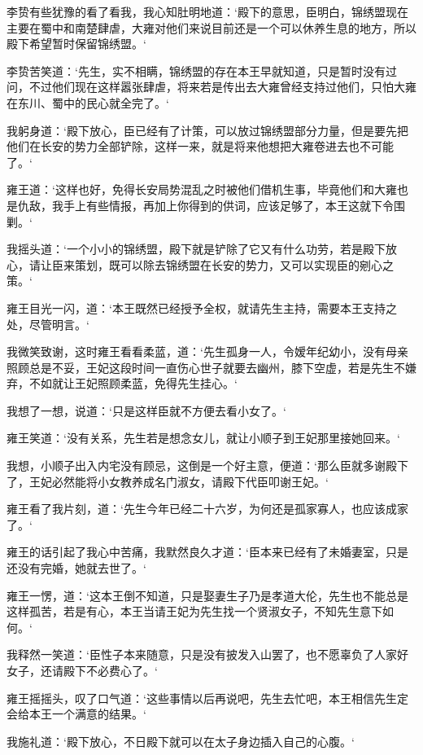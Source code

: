 李贽有些犹豫的看了看我，我心知肚明地道：‘殿下的意思，臣明白，锦绣盟现在主要在蜀中和南楚肆虐，大雍对他们来说目前还是一个可以休养生息的地方，所以殿下希望暂时保留锦绣盟。‘

李贽苦笑道：‘先生，实不相瞒，锦绣盟的存在本王早就知道，只是暂时没有过问，不过他们现在这样嚣张肆虐，将来若是传出去大雍曾经支持过他们，只怕大雍在东川、蜀中的民心就全完了。‘

我躬身道：‘殿下放心，臣已经有了计策，可以放过锦绣盟部分力量，但是要先把他们在长安的势力全部铲除，这样一来，就是将来他想把大雍卷进去也不可能了。‘

雍王道：‘这样也好，免得长安局势混乱之时被他们借机生事，毕竟他们和大雍也是仇敌，我手上有些情报，再加上你得到的供词，应该足够了，本王这就下令围剿。‘

我摇头道：‘一个小小的锦绣盟，殿下就是铲除了它又有什么功劳，若是殿下放心，请让臣来策划，既可以除去锦绣盟在长安的势力，又可以实现臣的剜心之策。‘

雍王目光一闪，道：‘本王既然已经授予全权，就请先生主持，需要本王支持之处，尽管明言。‘

我微笑致谢，这时雍王看看柔蓝，道：‘先生孤身一人，令嫒年纪幼小，没有母亲照顾总是不妥，王妃这段时间一直伤心世子就要去幽州，膝下空虚，若是先生不嫌弃，不如就让王妃照顾柔蓝，免得先生挂心。‘

我想了一想，说道：‘只是这样臣就不方便去看小女了。‘

雍王笑道：‘没有关系，先生若是想念女儿，就让小顺子到王妃那里接她回来。‘

我想，小顺子出入内宅没有顾忌，这倒是一个好主意，便道：‘那么臣就多谢殿下了，王妃必然能将小女教养成名门淑女，请殿下代臣叩谢王妃。‘

雍王看了我片刻，道：‘先生今年已经二十六岁，为何还是孤家寡人，也应该成家了。‘

雍王的话引起了我心中苦痛，我默然良久才道：‘臣本来已经有了未婚妻室，只是还没有完婚，她就去世了。‘

雍王一愣，道：‘这本王倒不知道，只是娶妻生子乃是孝道大伦，先生也不能总是这样孤苦，若是有心，本王当请王妃为先生找一个贤淑女子，不知先生意下如何。‘

我释然一笑道：‘臣性子本来随意，只是没有披发入山罢了，也不愿辜负了人家好女子，还请殿下不必费心了。‘

雍王摇摇头，叹了口气道：‘这些事情以后再说吧，先生去忙吧，本王相信先生定会给本王一个满意的结果。‘

我施礼道：‘殿下放心，不日殿下就可以在太子身边插入自己的心腹。‘

